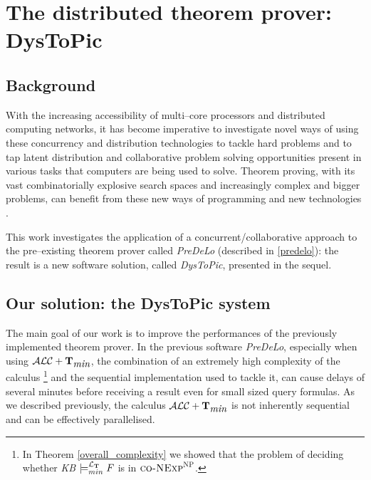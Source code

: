\documentclass[a4paper, 11pt, oneside]{duthesis}
\newcommand{\tip}{{\bf T}}
\newcommand{\alctmin}{\mathcal{ALC}+\tip_{\mbox{\em min}}}
\newcommand{\ellet} {\mathcal{L}_{\bf T}}
\begin{document}
\newpage


\chapter{The distributed theorem prover: DysToPic}\label{chap_dystopic}
\section{Background}\label{bg}
With the increasing accessibility of multi--core processors and distributed computing networks, it has become imperative to investigate novel ways of using these concurrency and distribution technologies to tackle hard problems and to tap latent distribution and collaborative problem solving opportunities present in various tasks that computers are being used to solve.
Theorem proving, with its vast combinatorially explosive search spaces and increasingly complex and bigger problems, can benefit from these new ways of programming and new technologies \cite{conf/ieeehpcs/SripriyaBS09}.


This work investigates the application of a concurrent/collaborative approach to the pre--existing theorem prover called \emph{PreDeLo} (described in \ref{predelo}): the result is a new software solution, called \emph{DysToPic}, presented in the sequel.




\section{Our solution: the DysToPic system}


The main goal of our work is to improve the performances of the previously implemented theorem prover.
In the previous software \emph{PreDeLo}, especially when using $\alctmin$, the combination of an extremely high complexity of the calculus \footnote{In Theorem \ref{overall_complexity} we showed that the problem of deciding whether \emph{KB} $\models_{min}^{\ellet} F$ is in $\textsc{co-NExp}^\textsc{NP}$.} and the sequential implementation used to tackle it, can cause delays of several minutes before receiving a result even for small sized query formulas.
As we described previously, the calculus $\alctmin$ is not inherently sequential and can be effectively parallelised.
\end{document}
